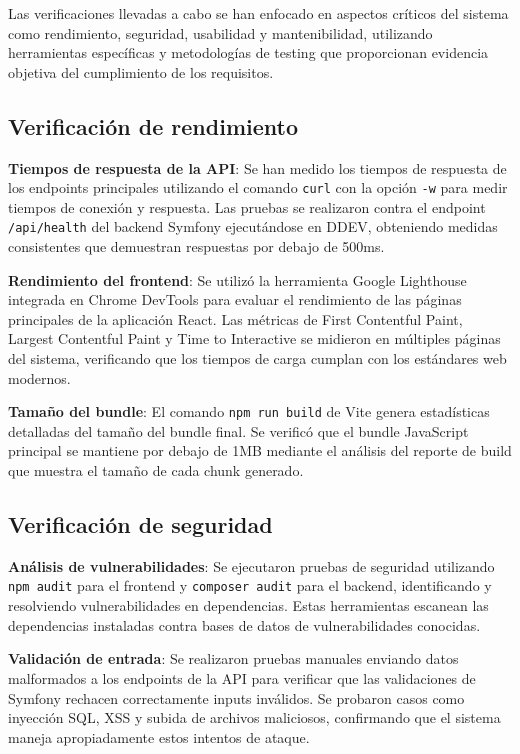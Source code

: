 \documentclass[12pt,a4paper,oneside]{report}
\begin{document}
Las verificaciones llevadas a cabo se han enfocado en aspectos críticos del sistema como rendimiento, seguridad, usabilidad y mantenibilidad, utilizando herramientas específicas y metodologías de testing que proporcionan evidencia objetiva del cumplimiento de los requisitos.

\subsection{Verificación de rendimiento}\label{verificacion-rendimiento}

\textbf{Tiempos de respuesta de la API}: Se han medido los tiempos de respuesta de los endpoints principales utilizando el comando \texttt{curl} con la opción \texttt{-w} para medir tiempos de conexión y respuesta. Las pruebas se realizaron contra el endpoint \texttt{/api/health} del backend Symfony ejecutándose en DDEV, obteniendo medidas consistentes que demuestran respuestas por debajo de 500ms.

\textbf{Rendimiento del frontend}: Se utilizó la herramienta Google Lighthouse integrada en Chrome DevTools para evaluar el rendimiento de las páginas principales de la aplicación React. Las métricas de First Contentful Paint, Largest Contentful Paint y Time to Interactive se midieron en múltiples páginas del sistema, verificando que los tiempos de carga cumplan con los estándares web modernos.

\textbf{Tamaño del bundle}: El comando \texttt{npm run build} de Vite genera estadísticas detalladas del tamaño del bundle final. Se verificó que el bundle JavaScript principal se mantiene por debajo de 1MB mediante el análisis del reporte de build que muestra el tamaño de cada chunk generado.

\subsection{Verificación de seguridad}\label{verificacion-seguridad}

\textbf{Análisis de vulnerabilidades}: Se ejecutaron pruebas de seguridad utilizando \texttt{npm audit} para el frontend y \texttt{composer audit} para el backend, identificando y resolviendo vulnerabilidades en dependencias. Estas herramientas escanean las dependencias instaladas contra bases de datos de vulnerabilidades conocidas.

\textbf{Validación de entrada}: Se realizaron pruebas manuales enviando datos malformados a los endpoints de la API para verificar que las validaciones de Symfony rechacen correctamente inputs inválidos. Se probaron casos como inyección SQL, XSS y subida de archivos maliciosos, confirmando que el sistema maneja apropiadamente estos intentos de ataque.
\end{document}
